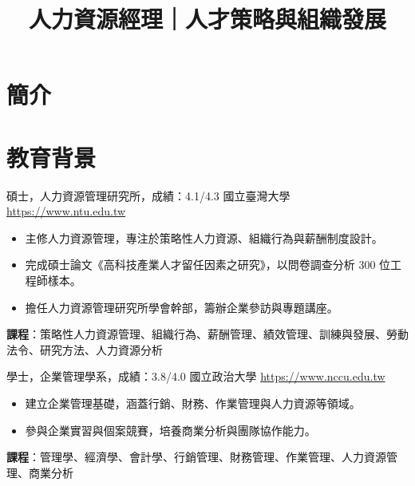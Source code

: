 \documentclass[a4paper, serif, 10pt]{moderncv}
\title{人力資源經理｜人才策略與組織發展}
\begin{document}
\maketitle

\section{簡介}

\section{教育背景}

        {碩士，人力資源管理研究所，成績：4.1/4.3}
        {國立臺灣大學}
        {\url{https://www.ntu.edu.tw}}
        {}
        {\begin{itemize}
\item 主修人力資源管理，專注於策略性人力資源、組織行為與薪酬制度設計。
\item 完成碩士論文《高科技產業人才留任因素之研究》，以問卷調查分析 300 位工程師樣本。
\item 擔任人力資源管理研究所學會幹部，籌辦企業參訪與專題講座。
\end{itemize}
\textbf{課程}：策略性人力資源管理、組織行為、薪酬管理、績效管理、訓練與發展、勞動法令、研究方法、人力資源分析}

        {學士，企業管理學系，成績：3.8/4.0}
        {國立政治大學}
        {\url{https://www.nccu.edu.tw}}
        {}
        {\begin{itemize}
\item 建立企業管理基礎，涵蓋行銷、財務、作業管理與人力資源等領域。
\item 參與企業實習與個案競賽，培養商業分析與團隊協作能力。
\end{itemize}
\textbf{課程}：管理學、經濟學、會計學、行銷管理、財務管理、作業管理、人力資源管理、商業分析}
\end{document}
